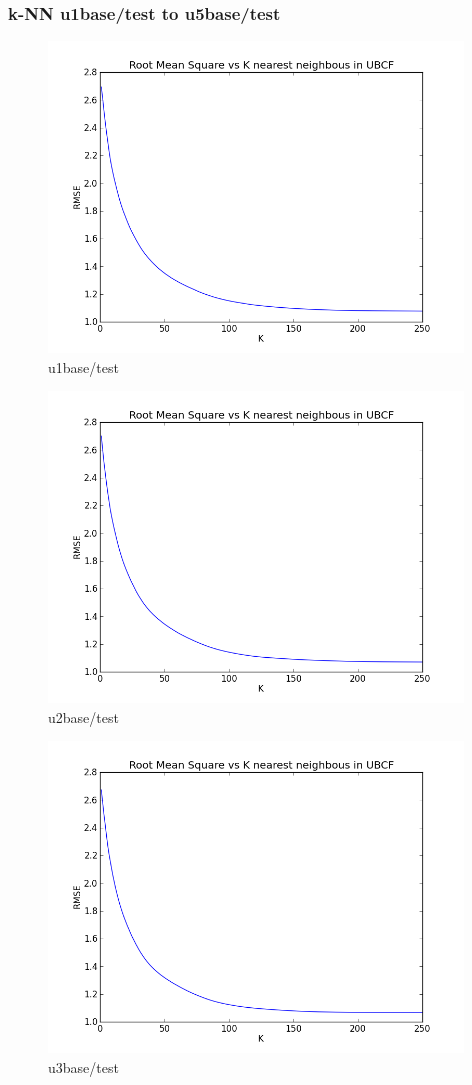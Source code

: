 \documentclass{article}
\begin{document}
\subsubsection{k-NN u1base/test to u5base/test}
\begin{figure}[h!tb]
\centering
\includegraphics[width=11cm]{6.png}
\caption {u1base/test}
\end{figure}
\begin{figure}[h!tb]
\centering
\includegraphics[width=11cm]{7.png}
\caption {u2base/test}
\end{figure}
\newpage
\begin{figure}[h!tb]
\centering
\includegraphics[width=11cm]{8.png}
\caption {u3base/test}
\end{figure}
\end{document}
